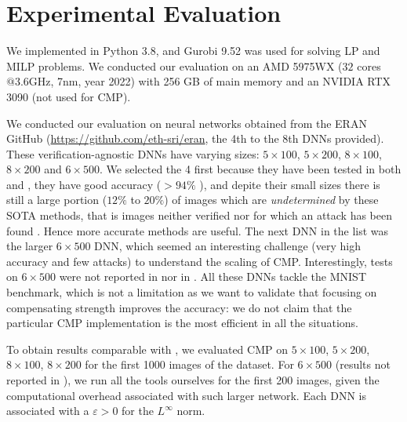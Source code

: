 \section{Experimental Evaluation}

%
We implemented \toolname in Python 3.8, and Gurobi 9.52 was used for solving LP and MILP problems. We conducted our evaluation on an AMD 5975WX  ($32$ cores$@3.6$GHz, 7nm, year 2022) 
with 256 GB of main memory and an NVIDIA RTX 3090 (not used for CMP). 


We conducted our evaluation on neural networks obtained from the ERAN GitHub (\url{https://github.com/eth-sri/eran}, the 4th to the 8th DNNs provided).
These verification-agnostic DNNs have varying sizes: $5\times 100$, $5\times 200$, $8 \times 100$, $8 \times 200$ and $6 \times 500$. We selected the 4 first because they have been tested in both \cite{prima} and \cite{crown}, they have good accuracy ($>94\%$ \cite{prima}), 
and depite their small sizes there is still a large portion ($12\%$ to $20\%$) of images which are {\em undetermined} by these SOTA methods, that is images neither verified nor for which an attack has been found  \cite{attack}. Hence more accurate methods are useful. 
The next DNN in the list was the larger $6 \times 500$ DNN, which seemed an interesting challenge (very high accuracy and few attacks) to understand the scaling of CMP. Interestingly, tests on $6 \times 500$ were not reported in \cite{prima} nor in \cite{crown}. All these DNNs tackle the MNIST benchmark, which is not a limitation as we want to validate that focusing on compensating strength improves the accuracy: we do not claim that the particular CMP implementation is the most efficient in all the situations.

To obtain results comparable with \cite{prima,crown}, 
we evaluated CMP on $5\times 100$, $5\times 200$, $8 \times 100$, $8 \times 200$ for the first 1000 images of the dataset. For $6\times 500$ (results not reported in \cite{prima,crown}), we run all the tools ourselves for the first 200 images, given the computational overhead associated with such larger network. Each DNN is associated with a $\varepsilon>0$ for the $L^\infty$ norm.

\smallskip

